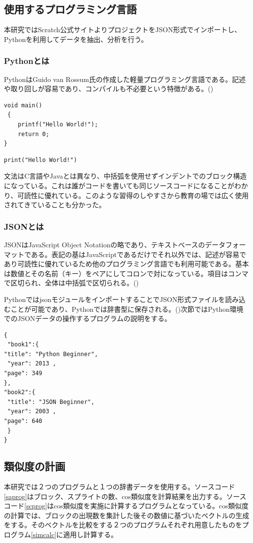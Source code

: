 \documentclass[a4paper,10pt,onecolumn,oneside,openany]{jsbook}
\begin{document}
\subsection{使用するプログラミング言語}
本研究ではScratch公式サイトよりプロジェクトをJSON形式でインポートし、Pythonを利用してデータを抽出、分析を行う。
\subsubsection{Pythonとは}
PythonはGuido van Rossum氏の作成した軽量プログラミング言語である。記述や取り回しが容易であり、コンパイルも不必要という特徴がある。(\cite{python})
 \begin{lstlisting}[caption=C言語,label=clan]
 void main()
 {
 	printf("Hello World!");
	return 0;
}
 \end{lstlisting}
 
 
 \begin{lstlisting}[caption=Python,label=python]
 print("Hello World!")
 \end{lstlisting}
 
文法はC言語やJavaとは異なり、中括弧を使用せずインデントでのブロック構造になっている。これは誰がコードを書いても同じソースコードになることがわかり、可読性に優れている。このような習得のしやすさから教育の場では広く使用されてきていることも分かった。
\subsubsection{JSONとは}
JSONはJavaScript Object Notationの略であり、テキストベースのデータフォーマットである。表記の基はJavaScriptであるだけでそれ以外では、記述が容易であり可読性に優れているため他のプログラミング言語でも利用可能である。基本は数値とその名前（キー）をペアにしてコロンで対になっている。項目はコンマで区切られ、全体は中括弧で区切られる。(\cite{json})

PythonではjsonモジュールをインポートすることでJSON形式ファイルを読み込むことが可能であり、Pythonでは辞書型に保存される。(\cite{json_py})次節ではPython環境でのJSONデータの操作するプログラムの説明をする。

 \begin{lstlisting}[caption=JSON,label=json]
 {
 "book1":{
"title": "Python Beginner",
 "year": 2013 ,
"page": 349
},
"book2":{
 "title": "JSON Beginner",
 "year": 2003 ,
"page": 640
 }
}
 \end{lstlisting}
 
\subsection{類似度の計画}
本研究では２つのプログラムと１つの辞書データを使用する。ソースコード\ref{saprog}はブロック、スプライトの数、cos類似度を計算結果を出力する。ソースコード\ref{scprog}はcos類似度を実施に計算するプログラムとなっている。cos類似度の計算では、ブロックの出現数を集計した後その数値に基づいたベクトルの生成をする。そのベクトルを比較をする２つのプログラムそれぞれ用意したものをプログラム\ref{simcalc}に適用し計算する。
\end{document}
